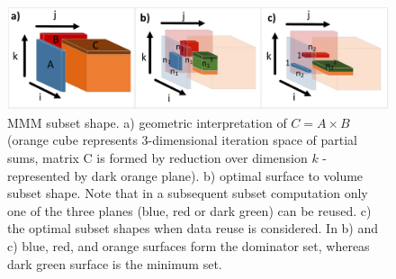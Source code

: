 \documentclass[sigplan,review,anonymous]{acmart}\settopmatter{printfolios=true,printccs=false,printacmref=false}
\begin{document}
%
%
 \begin{figure}
 	\includegraphics[width=\columnwidth]{figures/mmm_reuse}
 	\caption{MMM subset shape. a) 
 		geometric interpretation of $C = A \times B$ (orange cube represents 
 		3-dimensional iteration space of partial sums, matrix C is formed by 
 		reduction over dimension $k$ - represented by dark orange plane). b) 
 		optimal surface to volume subset shape. Note that in a subsequent 
 		subset computation only one of the three planes (blue, red or dark 
 		green) can be reused. c) the optimal subset shapes when 
 		data reuse is considered. In b) and c) blue, red, and orange surfaces 
 		form the dominator set, whereas dark green surface is the minimum set.}
 	\label{fig:mmmreuse}
 \end{figure}
\end{document}
